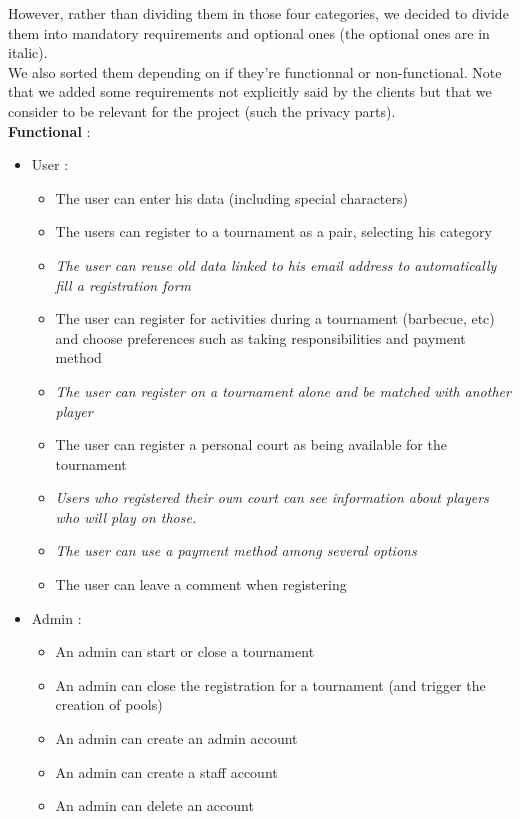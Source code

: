 \documentclass[a4paper, 12pt]{article}
\begin{document}
However, rather than dividing them in those four categories, we decided to divide them into mandatory requirements and optional ones (the optional ones are in italic). \\

We also sorted  them depending on if they're functionnal or non-functional. Note that we added some requirements not explicitly said by the clients but that we consider to be relevant for the project (such the privacy parts).\\


\textbf{Functional} :

\begin{itemize}

	\item User : 
	
	\begin{itemize}
		\item The user can enter his data (including special characters) 
		\item The users can register to a tournament as a pair, selecting his category 
		\item \textit{The user can reuse old data linked to his email address to automatically fill a registration form}
		\item The user can register for activities during a tournament (barbecue, etc) and choose preferences such as taking responsibilities and payment method
		\item \textit{The user can register on a tournament alone and be matched with another player}
		\item The user can register a personal court as being available for the tournament
		\item \textit{Users who registered their own court can see information about players who will play on those.}
		\item \textit{The user can use a payment method among several options}
		\item The user can leave a comment when registering
	\end{itemize}

    \item Admin : 
    
    \begin{itemize}
    	\item An admin can start or close a tournament
    	\item An admin can close the registration for a tournament (and trigger the creation of pools)
    	\item An admin can create an admin account
		\item An admin can create a staff account
		\item An admin can delete an account


\end{itemize}
\end{itemize}
\end{document}
